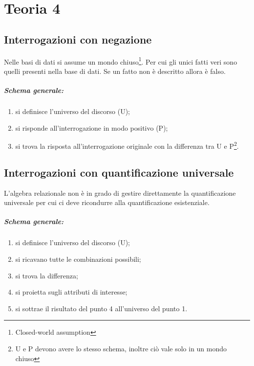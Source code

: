 \chapter{Teoria 4}

\section{Interrogazioni con negazione}

Nelle basi di dati si assume un mondo chiuso\footnote{Closed-world assumption}. Per cui gli unici fatti veri sono quelli presenti nella base di dati. Se un fatto non è descritto allora è falso.

\paragraph{Schema generale:}
\begin{enumerate}
    \item si definisce l'universo del discorso (U);
    \item si risponde all'interrogazione in modo positivo (P);
    \item si trova la risposta all'interrogazione originale con la differenza tra U e P\footnote{U e P devono avere lo stesso schema, inoltre ciò vale solo in un mondo chiuso}.
\end{enumerate}

\section{Interrogazioni con quantificazione universale}

L'algebra relazionale non è in grado di gestire direttamente la quantificazione universale per cui ci deve ricondurre alla quantificazione esistenziale.

\paragraph{Schema generale:}

\begin{enumerate}
    \item si definisce l'universo del discorso (U);
    \item si ricavano tutte le combinazioni possibili;
    \item si trova la differenza;
    \item si proietta sugli attributi di interesse;
    \item si sottrae il risultato del punto 4 all'universo del punto 1.
\end{enumerate}

